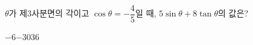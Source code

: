 $\theta$가 제$3$사분면의 각이고 $\cos\theta=-\dfrac{4}{5}$일 때, $5\sin\theta+8\tan\theta$의 값은?
\begin{choices32}{$-6$}{$-3$}{$0$}{$3$}{$6$}\end{choices32}
